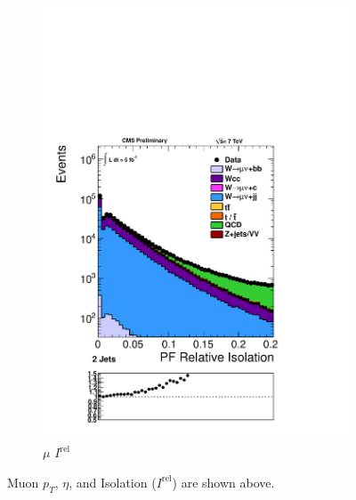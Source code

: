 \begin{figure}[hb]
\begin{subfigure}[b]{.45\textwidth}
	\includegraphics[trim = 0mm 52mm 0mm 0mm, clip,width=\textwidth]{images/muNuRelPFIso.pdf}
	\caption[]{$\mu$    $I^{\mathrm{rel}}$}
    \end{subfigure}
  \caption[]
   	{Muon $p_{T}$, $\eta$, and  Isolation ($I^\mathrm{rel}$) are shown above.}
    \label{fig:muonvariables}
\end{figure}

